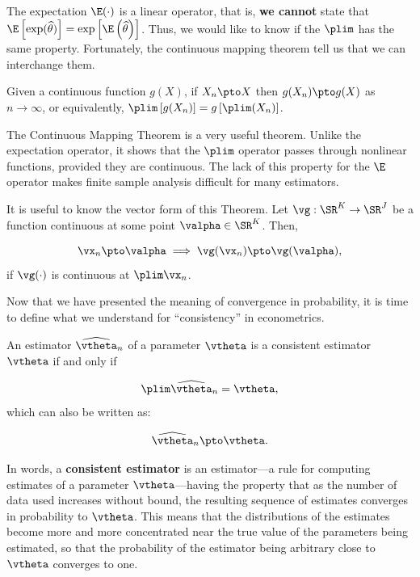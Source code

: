 The expectation $\E(\cdot)$ is a linear operator, that is, \textbf{we cannot} state that $\E\left[\exp(\widehat{\theta})\right] = \exp\left[\E\left(\widehat{\theta}\right)\right]$. Thus, we would like to know if the $\plim$ has the same property. Fortunately, the continuous mapping theorem tell us that we can interchange them. 

\begin{theorem}\label{teo:continuous_prob}
	Given a continuous function $g(X)$, if $X_n\pto X$ then $g(X_n)\pto g(X)$ as $n\to \infty$, or equivalently, $\plim \left[g(X_n)\right] = g\left[\plim (X_n)\right]$.
\end{theorem}

The Continuous Mapping Theorem is a very useful theorem. Unlike the expectation operator, it shows that the $\plim$ operator passes through nonlinear functions, provided they are continuous. The lack of this property for the $\E$ operator makes finite sample analysis difficult for many estimators. 


It is useful to know the vector form of this Theorem. Let $\vg:\SR^K\to\SR^J$ be a function continuous at some point $\valpha \in \SR^K$. Then, 

\begin{equation*}
  \vx_n \pto \valpha \implies \vg(\vx_n)\pto \vg(\valpha),
\end{equation*}
%
if $\vg(\cdot)$ is continuous at $\plim \vx_n$.


Now that we have presented the meaning of convergence in probability, it is time to define what we understand for ``consistency'' in econometrics.

\begin{definition}\label{def:consistent_est}
  An estimator $\widehat{\vtheta}_n$ of a parameter $\vtheta$ is a consistent estimator $\vtheta$ if and only if
  
  \begin{equation*}
    \plim \widehat{\vtheta}_n = \vtheta,
  \end{equation*}
%
which can also be written as:

  \begin{equation*}
    \widehat{\vtheta}_n \pto \vtheta.
  \end{equation*}
  
\end{definition}

In words, a \textbf{consistent estimator} is an estimator---a rule for computing estimates of a parameter $\vtheta$---having the property that as the number of data used increases without bound, the resulting sequence of estimates converges in probability to $\vtheta$. This means that the distributions of the estimates become more and more concentrated near the true value of the parameters being estimated, so that the probability of the estimator being arbitrary close to $\vtheta$ converges to one. 


